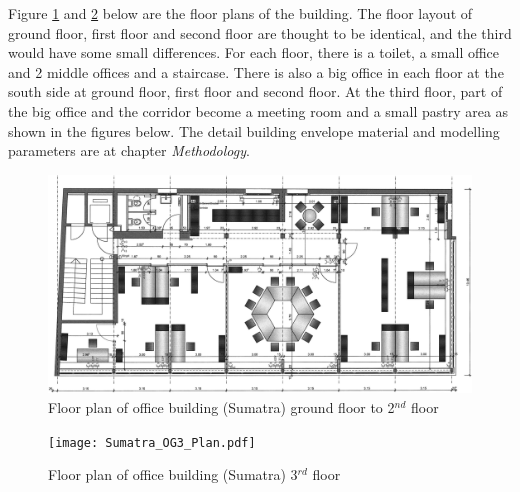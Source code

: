 \documentclass[11pt, a4paper]{article}
\theoremstyle{definition}
\begin{document}
		Figure \ref{fig:sumatra_og2} and \ref{fig:sumatra_og3} below are the floor plans of the building.
		The floor layout of ground floor, first floor and second floor are thought to be identical, and the third would have some small differences. For each floor, there is a toilet, a small office and 2 middle offices and a staircase. There is also a big office in each floor at the south side at ground floor, first floor and second floor. At the third floor, part of the big office and the corridor become a meeting room and a small pastry area as shown in the figures below. The detail building envelope material and modelling parameters are at chapter \textit{Methodology}.
		
		\begin{figure}[H]
		  \centering
		  \includegraphics[scale=0.13]{Sumatra_OG2_Plan.pdf}
		  \caption{Floor plan of office building (Sumatra) ground floor to 2$^{nd}$ floor}
		  \label{fig:sumatra_og2}
		 \end{figure}

		\begin{figure}[H]
		  \centering
		  \texttt{[image: Sumatra\_OG3\_Plan.pdf]}
		  \caption{Floor plan of office building (Sumatra) 3$^{rd}$ floor}
		  \label{fig:sumatra_og3}
		\end{figure}
	
	\newpage		
\end{document}

